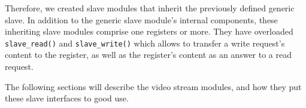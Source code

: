 Therefore, we created slave modules that inherit the previously defined generic slave.
In addition to the generic slave module's internal components, these inheriting slave modules comprise one registers or more.
They have overloaded \texttt{slave\_read()} and \texttt{slave\_write()} which allows to transfer a write request's content to the register, as well as the register's content as an answer to a read request.

The following sections will describe the video stream modules, and how they put these slave interfaces to good use.
